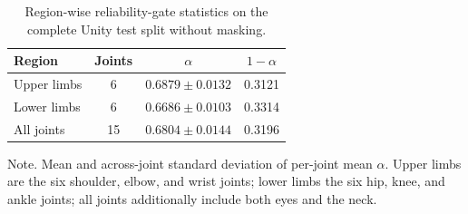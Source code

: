 \documentclass[preprint,12pt]{elsarticle}
\renewcommand{\textit}[1]{\textup{#1}}
\providecommand{\DIFaddbegin}{} %
\providecommand{\DIFaddend}{} %
\providecommand{\DIFdelbegin}{} %
\providecommand{\DIFdelend}{} %
\begin{document}
\DIFdelbegin %
\DIFdelend \DIFaddbegin \begin{table}[t]
\centering
\caption{Region-wise reliability-gate statistics on the complete Unity test split without masking.}
\label{tab:gate_region_summary}
\footnotesize
\setlength{\tabcolsep}{6pt}
\renewcommand{\arraystretch}{1.08}
\begin{tabular}{lccc}
\toprule
Region & Joints & \(\alpha\) & \(1-\alpha\) \\
\midrule
Upper limbs & 6 & \(0.6879 \pm 0.0132\) & 0.3121 \\
Lower limbs & 6 & \(0.6686 \pm 0.0103\) & 0.3314 \\
All joints & 15 & \(0.6804 \pm 0.0144\) & 0.3196 \\
\bottomrule
\end{tabular}
\vspace{0.4em}
\begin{minipage}{0.94\linewidth}
\footnotesize
\textit{Note.} Mean and across-joint standard deviation of per-joint mean \(\alpha\). Upper limbs are the six shoulder, elbow, and wrist joints; lower limbs the six hip, knee, and ankle joints; all joints additionally include both eyes and the neck.
\end{minipage}
\end{table}
\DIFaddend 
\end{document}
